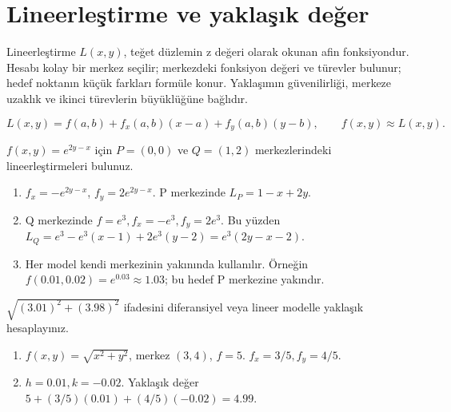 \section{Lineerleştirme ve yaklaşık değer}
Lineerleştirme \(L(x,y)\), teğet düzlemin z değeri olarak okunan afin fonksiyondur. Hesabı kolay bir merkez seçilir; merkezdeki fonksiyon değeri ve türevler bulunur; hedef noktanın küçük farkları formüle konur. Yaklaşımın güvenilirliği, merkeze uzaklık ve ikinci türevlerin büyüklüğüne bağlıdır.


{\small\[
L(x,y)=f(a,b)+f_x(a,b)(x-a)+f_y(a,b)(y-b),\qquad f(x,y)\approx L(x,y).
\]}
\begin{tcolorbox}[title={Örnek 5.6 | Dersteki üstel fonksiyonun iki lineerleştirmesi},colframe=accent]\(f(x,y)=e^{2y-x}\) için \(P=(0,0)\) ve \(Q=(1,2)\) merkezlerindeki lineerleştirmeleri bulunuz.
\par{}\end{tcolorbox}
\begin{tcolorbox}[title={Adım adım çözüm},colback=green!3!white,colframe=green]\begin{enumerate}
\item \(f_x=-e^{2y-x}\), \(f_y=2e^{2y-x}\). P merkezinde \(L_P=1-x+2y\).
\item Q merkezinde \(f=e^3,f_x=-e^3,f_y=2e^3\). Bu yüzden \(L_Q=e^3-e^3(x-1)+2e^3(y-2)=e^3(2y-x-2)\).
\item Her model kendi merkezinin yakınında kullanılır. Örneğin \(f(0.01,0.02)=e^{0.03}\approx1.03\); bu hedef P merkezine yakındır.
\end{enumerate}\end{tcolorbox}
\begin{tcolorbox}[title={Örnek 5.7 | Karekökün yaklaşık değeri},colframe=accent]\(\sqrt{(3.01)^2+(3.98)^2}\) ifadesini diferansiyel veya lineer modelle yaklaşık hesaplayınız.
\par\vspace{1mm}{\scriptsize\sffamily Pekiştirme}\end{tcolorbox}
\begin{tcolorbox}[title={Adım adım çözüm},colback=green!3!white,colframe=green]\begin{enumerate}
\item \(f(x,y)=\sqrt{x^2+y^2}\), merkez \((3,4)\), \(f=5\). \(f_x=3/5,f_y=4/5\).
\item \(h=0.01,k=-0.02\). Yaklaşık değer \(5+(3/5)(0.01)+(4/5)(-0.02)=4.99\).
\end{enumerate}\end{tcolorbox}
